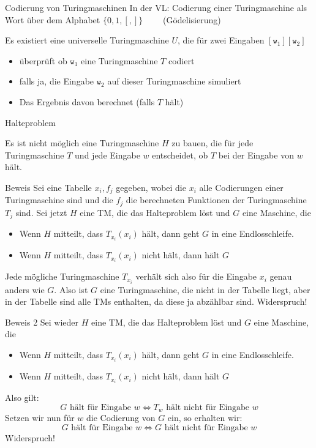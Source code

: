 \begin{frame}{Codierung von Turingmaschinen}
	In der VL: Codierung einer Turingmaschine als Wort über dem Alphabet \nolinebreak $\{0,1,[,]\} \qquad$ (Gödelisierung)
	\bigskip
	
	\begin{Satz}
		Es existiert eine universelle Turingmaschine $U$, die für zwei Eingaben $[\mathtt w_1][\mathtt w_2]$ 
		\begin{itemize}
			\item überprüft ob $\mathtt w_1$ eine Turingmaschine $T$ codiert
			\item falls ja, die Eingabe $\mathtt w_2$ auf dieser Turingmaschine simuliert
			\item Das Ergebnis davon berechnet (falls $T$ hält)
		\end{itemize}
	\end{Satz}
\end{frame}

\begin{frame}{Halteproblem}
	\begin{Satz}
		Es ist nicht möglich eine Turingmaschine $H$ zu bauen, die für jede Turingmaschine $T$ und jede Eingabe $w$ entscheidet, ob $T$ bei der Eingabe von $w$ hält.
	\end{Satz}
\end{frame}

\begin{frame}{Beweis}
	Sei eine Tabelle $x_i, f_j$ gegeben, wobei die $x_i$ alle Codierungen einer Turingmaschine sind und die $f_j$ die berechneten Funktionen der Turingmaschine $T_j$ sind. Sei jetzt $H$ eine TM, die das Halteproblem löst und $G$ eine Maschine, die \begin{itemize}
		\item Wenn $H$ mitteilt, dass $T_{x_i} ( x_i )$ hält, dann geht $G$ in eine Endlosschleife.
		\item Wenn $H$ mitteilt, dass $T_{x_i} ( x_i )$ nicht hält, dann hält $G$
	\end{itemize}
	Jede mögliche Turingmaschine $T_{x_i}$ verhält sich also für die Eingabe $x_i$ genau anders wie $G$. Also ist $G$ eine Turingmaschine, die nicht in der Tabelle liegt, aber in der Tabelle sind alle TMs enthalten, da diese ja abzählbar sind. Widerspruch!
\end{frame}

\begin{frame}{Beweis 2}
	Sei wieder $H$ eine TM, die das Halteproblem löst und $G$ eine Maschine, die \begin{itemize}
		\item Wenn $H$ mitteilt, dass $T_{x_i} ( x_i )$ hält, dann geht $G$ in eine Endlosschleife.
		\item Wenn $H$ mitteilt, dass $T_{x_i} ( x_i )$ nicht hält, dann hält $G$
	\end{itemize}
	Also gilt: $$ G \text{ hält für Eingabe } w \iff T_w \text{ hält nicht für Eingabe } w $$
	Setzen wir nun für $w$ die Codierung von $G$ ein, so erhalten wir:
	$$ G \text{ hält für Eingabe } w \iff G \text{ hält nicht für Eingabe } w $$
	Widerspruch!
\end{frame}


